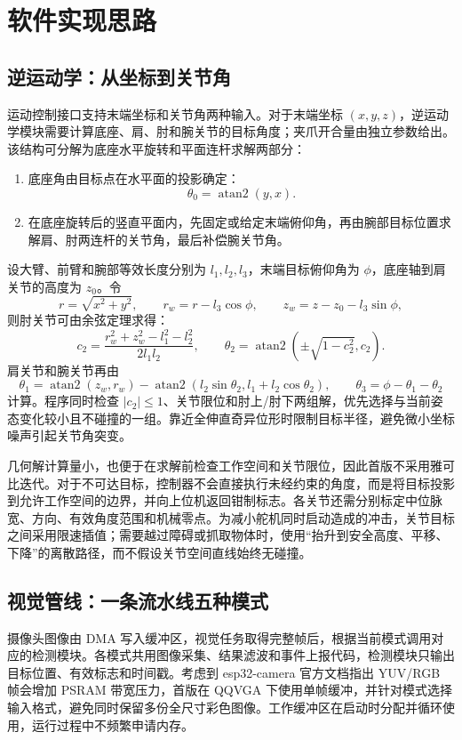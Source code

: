 \section{软件实现思路}

\subsection{逆运动学：从坐标到关节角}

运动控制接口支持末端坐标和关节角两种输入。对于末端坐标 $(x,y,z)$，逆运动学模块需要计算底座、肩、肘和腕关节的目标角度；夹爪开合量由独立参数给出。该结构可分解为底座水平旋转和平面连杆求解两部分：

\begin{enumerate}
  \item 底座角由目标点在水平面的投影确定：
  \[
    \theta_0=\operatorname{atan2}(y,x).
  \]
  \item 在底座旋转后的竖直平面内，先固定或给定末端俯仰角，再由腕部目标位置求解肩、肘两连杆的关节角，最后补偿腕关节角。
\end{enumerate}

设大臂、前臂和腕部等效长度分别为 $l_1,l_2,l_3$，末端目标俯仰角为 $\phi$，底座轴到肩关节的高度为 $z_0$。令
\[
  r=\sqrt{x^2+y^2},\qquad
  r_w=r-l_3\cos\phi,\qquad
  z_w=z-z_0-l_3\sin\phi ,
\]
则肘关节可由余弦定理求得：
\[
  c_2=\frac{r_w^2+z_w^2-l_1^2-l_2^2}{2l_1l_2},\qquad
  \theta_2=\operatorname{atan2}\!\left(\pm\sqrt{1-c_2^2},c_2\right).
\]
肩关节和腕关节再由
\[
  \theta_1=\operatorname{atan2}(z_w,r_w)
  -\operatorname{atan2}(l_2\sin\theta_2,l_1+l_2\cos\theta_2),
  \qquad
  \theta_3=\phi-\theta_1-\theta_2
\]
计算。程序同时检查 $|c_2|\leq1$、关节限位和肘上/肘下两组解，优先选择与当前姿态变化较小且不碰撞的一组。靠近全伸直奇异位形时限制目标半径，避免微小坐标噪声引起关节角突变。

几何解计算量小，也便于在求解前检查工作空间和关节限位，因此首版不采用雅可比迭代。对于不可达目标，控制器不会直接执行未经约束的角度，而是将目标投影到允许工作空间的边界，并向上位机返回钳制标志。各关节还需分别标定中位脉宽、方向、有效角度范围和机械零点。为减小舵机同时启动造成的冲击，关节目标之间采用限速插值；需要越过障碍或抓取物体时，使用“抬升到安全高度、平移、下降”的离散路径，而不假设关节空间直线始终无碰撞。

\subsection{视觉管线：一条流水线五种模式}

摄像头图像由 DMA 写入缓冲区，视觉任务取得完整帧后，根据当前模式调用对应的检测模块。各模式共用图像采集、结果滤波和事件上报代码，检测模块只输出目标位置、有效标志和时间戳。考虑到 esp32-camera 官方文档指出 YUV/RGB 帧会增加 PSRAM 带宽压力，首版在 QQVGA 下使用单帧缓冲，并针对模式选择输入格式，避免同时保留多份全尺寸彩色图像。工作缓冲区在启动时分配并循环使用，运行过程中不频繁申请内存。

